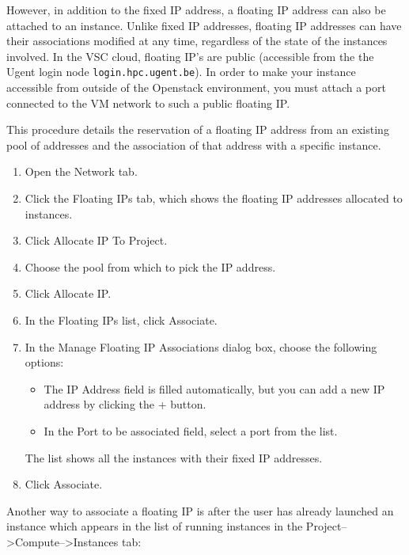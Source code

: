 However, in addition to the fixed IP address, a floating IP address
can also be attached to an instance.  Unlike fixed IP addresses,
floating IP addresses can have their associations modified at any
time, regardless of the state of the instances involved.  In the VSC
cloud, floating IP's are public (accessible from the the Ugent login
node \lstinline{login.hpc.ugent.be}).  In order to make your instance
accessible from outside of the Openstack environment, you must attach
a port connected to the VM network to such a public floating IP.

This procedure details the reservation of a floating IP address from
an existing pool of addresses and the association of that address with
a specific instance.

\begin{enumerate}
\item Open the Network tab.
\item Click the Floating IPs tab, which shows the floating IP
  addresses allocated to instances.
\item Click Allocate IP To Project.
\item Choose the pool from which to pick the IP address.
\item Click Allocate IP.
\item In the Floating IPs list, click Associate.
\item In the Manage Floating IP Associations dialog box, choose the
  following options:

  \begin{itemize}
  \item The IP Address field is filled automatically, but you can add
    a new IP address by clicking the + button.
  \item In the Port to be associated field, select a port from the
    list.
  \end{itemize}

  The list shows all the instances with their fixed IP addresses.
\item Click Associate.
\end{enumerate}

Another way to associate a floating IP is after the user has already launched an instance which appears in the list of running instances in the Project-->Compute-->Instances tab:

